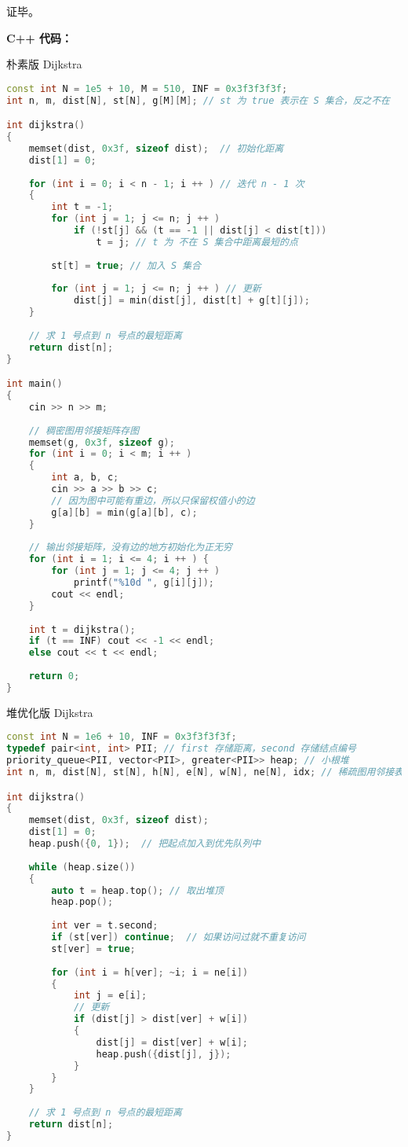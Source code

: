 证毕。

\textbf{C++ 代码：}

朴素版 Dijkstra
\begin{lstlisting}[language=cpp]
const int N = 1e5 + 10, M = 510, INF = 0x3f3f3f3f;
int n, m, dist[N], st[N], g[M][M]; // st 为 true 表示在 S 集合，反之不在

int dijkstra()
{
    memset(dist, 0x3f, sizeof dist);  // 初始化距离
    dist[1] = 0;
    
    for (int i = 0; i < n - 1; i ++ ) // 迭代 n - 1 次
    {
        int t = -1;
        for (int j = 1; j <= n; j ++ )
            if (!st[j] && (t == -1 || dist[j] < dist[t]))
                t = j; // t 为 不在 S 集合中距离最短的点
        
        st[t] = true; // 加入 S 集合
        
        for (int j = 1; j <= n; j ++ ) // 更新
            dist[j] = min(dist[j], dist[t] + g[t][j]);
    }
    
    // 求 1 号点到 n 号点的最短距离
    return dist[n];
}

int main()
{
    cin >> n >> m;
    
    // 稠密图用邻接矩阵存图
    memset(g, 0x3f, sizeof g);
    for (int i = 0; i < m; i ++ ) 
    {
        int a, b, c;
        cin >> a >> b >> c;
        // 因为图中可能有重边，所以只保留权值小的边
        g[a][b] = min(g[a][b], c);
    }
    
    // 输出邻接矩阵，没有边的地方初始化为正无穷
    for (int i = 1; i <= 4; i ++ ) {
        for (int j = 1; j <= 4; j ++ )
            printf("%10d ", g[i][j]);
        cout << endl;
    }
    
    int t = dijkstra();
    if (t == INF) cout << -1 << endl; 
    else cout << t << endl;
    
    return 0;
}
\end{lstlisting}

堆优化版 Dijkstra

\begin{lstlisting}[language=cpp]
const int N = 1e6 + 10, INF = 0x3f3f3f3f;
typedef pair<int, int> PII; // first 存储距离，second 存储结点编号
priority_queue<PII, vector<PII>, greater<PII>> heap; // 小根堆
int n, m, dist[N], st[N], h[N], e[N], w[N], ne[N], idx; // 稀疏图用邻接表存图

int dijkstra()
{
    memset(dist, 0x3f, sizeof dist);
    dist[1] = 0;
    heap.push({0, 1});  // 把起点加入到优先队列中
    
    while (heap.size())
    {
        auto t = heap.top(); // 取出堆顶
        heap.pop();
        
        int ver = t.second;
        if (st[ver]) continue;  // 如果访问过就不重复访问
        st[ver] = true;
        
        for (int i = h[ver]; ~i; i = ne[i])
        {
            int j = e[i];
            // 更新
            if (dist[j] > dist[ver] + w[i])
            {
                dist[j] = dist[ver] + w[i];
                heap.push({dist[j], j});
            }
        }
    }
    
    // 求 1 号点到 n 号点的最短距离
    return dist[n];
}
\end{lstlisting}

